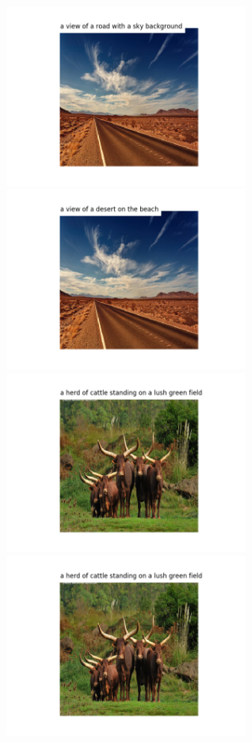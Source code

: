 \documentclass{article}
\begin{document}
\hspace*{-1cm}\includegraphics[width=80mm]{images/Figure_33.png}
\hspace*{-1cm}\includegraphics[width=80mm]{images/MFigure_33.png}
\hspace*{-1cm}\includegraphics[width=80mm]{images/Figure_44.png}
\hspace*{-1cm}\includegraphics[width=80mm]{images/MFigure_44.png}
\end{document}
